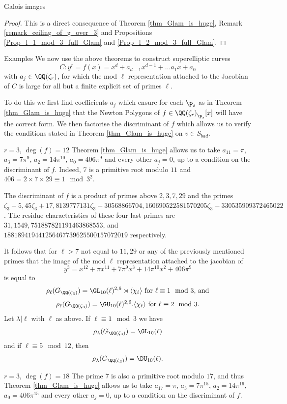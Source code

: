 \documentclass[11pt,a4paper]{article}
\newcommand{\Qr}{{\QQ(\zeta_r)}}
\newcommand{\Gcyclo}[1]{G_{\QQ(\zeta_{#1})}}
\begin{document}
\begin{section}{Galois images}
\begin{proof}
This is a direct consequence of Theorem \ref{thm_Glam_is_huge}, Remark \ref{remark_ceiling_of_g_over_3} and Propositions \ref{Prop_l_1_mod_3_full_Glam} and \ref{Prop_l_2_mod_3_full_Glam}.
\end{proof}
\begin{subsection}{Examples}
\label{subsection_examples}
We now use the above theorems to construct superelliptic curves 
\[C\colon y^r = f(x) = x^d +a_{d-1}x^{d-1} + \ldots a_1x+a_0\] with $a_j \in \Qr$, for which the mod $\ell$ representation attached to the Jacobian of $C$ is large for all but a finite explicit set of primes $\ell$.

To do this we first find coefficients $a_j$ which ensure for each $\p_s$ as in Theorem \ref{thm_Glam_is_huge} that the Newton Polygons of $f \in \Qr_{\p_s}[x]$ will have the correct form.
We then factorise the discriminant of $f$ which allows us to verify the conditions stated in Theorem \ref{thm_Glam_is_huge} on $v \in S_{bad}$.
\begin{subsubsection}{$r=3$, $\deg(f) = 12$}
Theorem \ref{thm_Glam_is_huge} allows us to take $a_{11}= \pi$, $a_3=7\pi^9$, $a_2 = 14\pi^{10}$, $a_0 = 406\pi^9$ and every other $a_j=0$, up to a condition on the discriminant of $f$. Indeed, 7 is a primitive root modulo $11$ and $406 = 2 \times 7 \times 29 \equiv 1 \mod{3^2}$.

The discriminant of $f$ is a product of primes above $2,3,7,29$  and the primes $\zeta_3 - 5, 45\zeta_3 +
17, 8139777131\zeta_3 + 30568866704, 160690522581570205\zeta_3 -
330535909372465022$. The residue characteristics of these four last primes are $31, 1549, 751887821191463868553$, and \\ $188189419441256467739625500157072019$ respectively.

It follows that for $\ell>7$ not equal to $11, 29$ or any of the previously mentioned primes that the image of the mod $\ell$ representation attached to the jacobian of
\[y^3 = x^{12} + \pi x^{11} + 7\pi^{9} x^3 + 14\pi ^{10} x^2 + 406\pi^9
\]
is equal to 
\[\rho_\ell(\Gcyclo{3}) = \GL_{10}(\ell)^{2,6} \rtimes \langle \chi_\ell \rangle \text{ for $\ell \equiv 1 \mod{3}$, and}
\]
\[\rho_\ell(\Gcyclo{3}) = \GU_{10}(\ell)^{2,6} . \langle \chi_\ell \rangle \text{ for $\ell \equiv 2 \mod{3}$.}
\]
Let $\lambda|\ell$ with $\ell$ as above. If $\ell \equiv 1 \mod{3}$ we have \[\rho_\lambda(\Gcyclo{3})=\GL_{10}(\ell)\]
and if $\ell \equiv 5 \mod{12}$, then
\[\rho_\lambda(\Gcyclo{3})=\DU_{10}(\ell).\]
\end{subsubsection}
\begin{subsubsection}{$r=3$, $\deg(f) = 18$}
The prime $7$ is also a primitive root modulo $17$, and thus Theorem \ref{thm_Glam_is_huge} allows us to take $a_{17}= \pi$, $a_3=7\pi^{15}$, $a_2 = 14\pi^{16}$, $a_0 = 406\pi^{15}$ and every other $a_j=0$, up to a condition on the discriminant of $f$.


\end{subsubsection}
\end{subsection}
\end{section}
\end{document}
